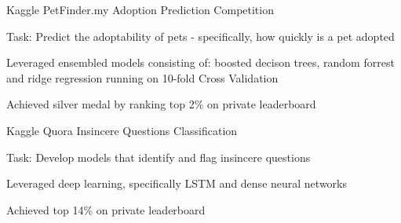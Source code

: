 

\begin{cventries}
  \cventry
    {Kaggle} %
    {PetFinder.my Adoption Prediction Competition} %
    {} %
    {} %
    {
      \begin{cvitems} %
      \item {Task: Predict the adoptability of pets - specifically, how quickly is a pet adopted}
      \item {Leveraged ensembled models consisting of: boosted decison trees, random forrest and ridge regression running on 10-fold Cross Validation}
      \item {Achieved silver medal by ranking top 2\% on private leaderboard}
      \end{cvitems}
    }
  \cventry
    {Kaggle} %
    {Quora Insincere Questions Classification} %
    {} %
    {} %
    {
      \begin{cvitems} %
      \item {Task: Develop models that identify and flag insincere questions}
      \item {Leveraged deep learning, specifically LSTM and dense neural networks}
      \item {Achieved top 14\% on private leaderboard}
      \end{cvitems}
    }
\end{cventries}
